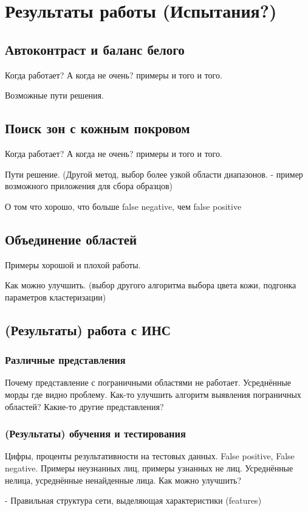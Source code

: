 \documentclass[12pt]{report}
\begin{document}
\chapter{Результаты работы (Испытания?)}
\thispagestyle{fancy}

\section{Автоконтраст и баланс белого}
Когда работает? А когда не очень? примеры и того и того.

Возможные пути решения.
\section{Поиск зон с кожным покровом}
Когда работает? А когда не очень? примеры и того и того.

Пути решение. (Другой метод, выбор более узкой области диапазонов. - пример возможного приложения для сбора образцов)

О том что хорошо, что больше false negative, чем false positive
\section{Объединение областей}
Примеры хорошой и плохой работы.

Как можно улучшить. (выбор другого алгоритма выбора цвета кожи, подгонка параметров кластеризации)
\section{(Результаты) работа с ИНС}
\subsection{Различные представления}
Почему представление с пограничными областями не работает. Усреднённые морды где видно проблему. Как-то улучшить алгоритм выявления пограничных областей? Какие-то другие представления?
\subsection{(Результаты) обучения и тестирования}
Цифры, проценты результативности на тестовых данных. False positive, False negative. Примеры неузнанных лиц, примеры узнанных не лиц. Усреднённые нелица, усреднённые ненайденные лица.
Как можно улучшить?

- Правильная структура сети, выделяющая характеристики (features)
\end{document}
